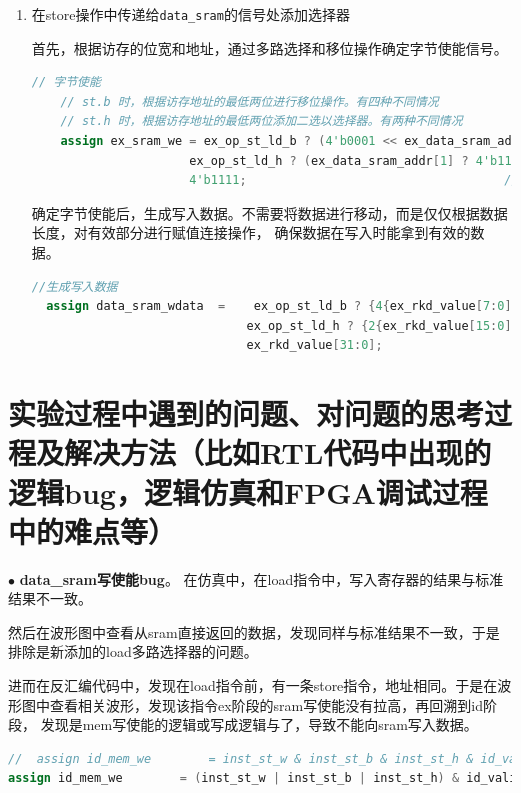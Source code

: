 \documentclass[11pt]{article}
\begin{document}
\begin{enumerate}
  \item 在store操作中传递给\verb|data_sram|的信号处添加选择器
  
  首先，根据访存的位宽和地址，通过多路选择和移位操作确定字节使能信号。
  \begin{lstlisting}[language=verilog]
    // 字节使能
    // st.b 时，根据访存地址的最低两位进行移位操作。有四种不同情况
    // st.h 时，根据访存地址的最低两位添加二选以选择器。有两种不同情况
    assign ex_sram_we = ex_op_st_ld_b ? (4'b0001 << ex_data_sram_addr[1:0]) :           // st.b
                      ex_op_st_ld_h ? (ex_data_sram_addr[1] ? 4'b1100 : 4'b0011) :    // st.h
                      4'b1111;                                    // st.w
  \end{lstlisting}
  确定字节使能后，生成写入数据。不需要将数据进行移动，而是仅仅根据数据长度，对有效部分进行赋值连接操作，
  确保数据在写入时能拿到有效的数据。
\begin{lstlisting}[language=verilog]
  //生成写入数据
  assign data_sram_wdata  =    ex_op_st_ld_b ? {4{ex_rkd_value[7:0]}}:
                              ex_op_st_ld_h ? {2{ex_rkd_value[15:0]}}:
                              ex_rkd_value[31:0];
\end{lstlisting}
\end{enumerate}


\vspace{1ex}

\section{实验过程中遇到的问题、对问题的思考过程及解决方法（比如RTL代码中出现的逻辑bug，逻辑仿真和FPGA调试过程中的难点等）}

\noindent
$\bullet$
\textbf{data_sram写使能bug}。
在仿真中，在load指令中，写入寄存器的结果与标准结果不一致。

然后在波形图中查看从sram直接返回的数据，发现同样与标准结果不一致，于是排除是新添加的load多路选择器的问题。

进而在反汇编代码中，发现在load指令前，有一条store指令，地址相同。于是在波形图中查看相关波形，发现该指令ex阶段的sram写使能没有拉高，再回溯到id阶段，
发现是mem写使能的逻辑或写成逻辑与了，导致不能向sram写入数据。

\begin{lstlisting}[language=verilog]
//  assign id_mem_we        = inst_st_w & inst_st_b & inst_st_h & id_valid;  
assign id_mem_we        = (inst_st_w | inst_st_b | inst_st_h) & id_valid;  
\end{lstlisting}
\vspace{1ex}
\end{document}
